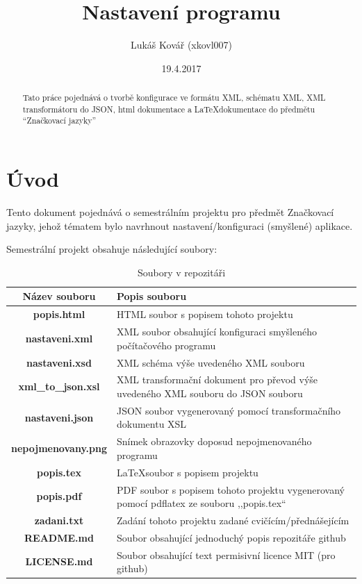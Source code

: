 \documentclass[czech]{article}
\providecommand{\tabularnewline}{\\}
\begin{document}
\title{Nastavení programu}


\author{Lukáš Kovář (xkovl007)}


\date{19.4.2017}
\maketitle
\begin{abstract}
Tato práce pojednává o tvorbě konfigurace ve formátu XML, schématu
XML, XML transformátoru do JSON, html dokumentace a \LaTeX dokumentace
do předmětu ``Značkovací jazyky''
\end{abstract}
\newpage{}

\tableofcontents{}

\listoffigures


\listoftables


\newpage{}


\section{Úvod}

Tento dokument pojednává o semestrálním projektu pro předmět \textquotedbl{}Značkovací
jazyky\textquotedbl{}, jehož tématem bylo navrhnout nastavení/konfiguraci
(smyšlené) aplikace.

Semestrální projekt obsahuje následující soubory:

\begin{center}
\begin{table}[H]
\begin{centering}
\begin{tabular}{|c|>{\centering}p{10cm}|}
\hline 
\textbf{Název souboru} & \textbf{Popis souboru}\tabularnewline
\hline 
\hline 
\textbf{popis.html} & HTML soubor s popisem tohoto projektu\tabularnewline
\hline 
\textbf{nastaveni.xml} & XML soubor obsahující konfiguraci smyšleného počítačového programu\tabularnewline
\hline 
\textbf{nastaveni.xsd} & XML schéma výše uvedeného XML souboru\tabularnewline
\hline 
\textbf{xml\_to\_json.xsl} & XML transformační dokument pro převod výše uvedeného XML souboru do
JSON souboru\tabularnewline
\hline 
\textbf{nastaveni.json} & JSON soubor vygenerovaný pomocí transformačního dokumentu XSL\tabularnewline
\hline 
\textbf{nepojmenovany.png} & Snímek obrazovky doposud nepojmenovaného programu\tabularnewline
\hline 
\textbf{popis.tex} & \LaTeX soubor s popisem projektu\tabularnewline
\hline 
\textbf{popis.pdf} & PDF soubor s popisem tohoto projektu vygenerovaný pomocí pdflatex
ze souboru ,,popis.tex``\tabularnewline
\hline 
\textbf{zadani.txt} & Zadání tohoto projektu zadané cvičícím/přednášejícím\tabularnewline
\hline 
\textbf{README.md} & Soubor obsahující jednoduchý popis repozitáře github\tabularnewline
\hline 
\textbf{LICENSE.md} & Soubor obsahující text permisivní licence MIT (pro github)\tabularnewline
\hline 
\end{tabular}
\par\end{centering}

\caption{Soubory v repozitáři}
\end{table}

\par\end{center}
\end{document}
